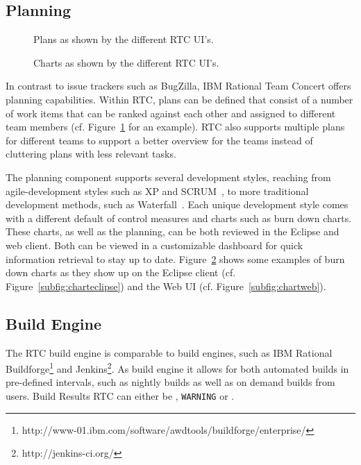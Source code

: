\subsection{Planning}
\begin{figure}[t]
\centering
{}
\caption{Plans as shown by the different RTC UI's.}
\label{fig:plan}
\end{figure}
\begin{figure}[t]
\centering
{}
\caption{Charts as shown by the different RTC UI's.}
\label{fig:charts}
\end{figure}
\vspace{5pt}
In contrast to issue trackers such as BugZilla, IBM Rational Team Concert offers planning capabilities.
Within RTC, plans can be defined that consist of a number of work items that can be ranked against each other and assigned to different team members (cf.  Figure~\ref{fig:plan} for an example).
RTC also supports multiple plans for different teams to support a better overview for the teams instead of cluttering plans with less relevant tasks.

The planning component supports several development styles, reaching from agile-development styles such as XP and SCRUM~\cite{larman:ieeecomputer:2003}, to more traditional development methods, such as Waterfall~\cite{boehm:senotes:1986}.
Each unique development style comes with a different default of control measures and charts such as burn down charts.
These charts, as well as the planning, can be both reviewed in the Eclipse and web client.
Both can be viewed in a customizable dashboard for quick information retrieval to stay up to date.
Figure~\ref{fig:charts} shows some examples of burn down charts as they show up on the Eclipse client (cf. Figure~\ref{subfig:charteclipse}) and the Web UI (cf. Figure~\ref{subfig:chartweb}).

\subsection{Build Engine}
The RTC build engine is comparable to build engines, such as IBM Rational Buildforge\footnote{http://www-01.ibm.com/software/awdtools/buildforge/enterprise/} and Jenkins\footnote{http://jenkins-ci.org/}.
As build engine it allows for both automated builds in pre-defined intervals, such as nightly builds as well as on demand builds from users.
Build Results RTC can either be \error, \texttt{WARNING} or \ok. 

